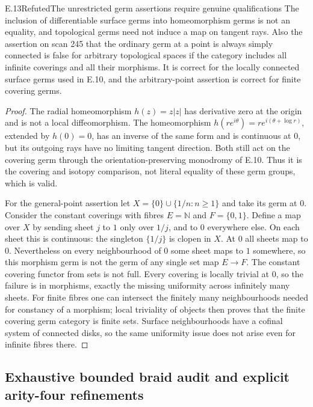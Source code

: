 \begin{statement}{E.13}{Refuted}{The unrestricted germ assertions require genuine qualifications}
The inclusion of differentiable surface germs into homeomorphism
germs is not an equality, and topological germs need not induce a
map on tangent rays.  Also the assertion on scan 245 that the
ordinary germ at a point is always simply connected is false for
arbitrary topological spaces if the category includes all infinite
coverings and all their morphisms.  It is correct for the locally
connected surface germs used in E.10, and the arbitrary-point
assertion is correct for finite covering germs.
\end{statement}
\begin{proof}
The radial homeomorphism $h(z)=z|z|$ has derivative zero at the
origin and is not a local diffeomorphism.  The homeomorphism
$h(re^{i\theta})=re^{i(\theta+\log r)}$, extended by $h(0)=0$,
has an inverse of the same form and is continuous at $0$, but
its outgoing rays have no limiting tangent direction.  Both still
act on the covering germ through the orientation-preserving
monodromy of E.10.  Thus it is the covering and isotopy comparison,
not literal equality of these germ groups, which is valid.

For the general-point assertion let
$X=\{0\}\cup\{1/n:n\geq1\}$ and take its germ at $0$.
Consider the constant coverings with fibres $E=\mathbb N$ and
$F=\{0,1\}$.  Define a map over $X$ by sending sheet $j$ to $1$
only over $1/j$, and to $0$ everywhere else.  On each sheet this
is continuous: the singleton $\{1/j\}$ is clopen in $X$.
At $0$ all sheets map to $0$.  Nevertheless on every neighbourhood
of $0$ some sheet maps to $1$ somewhere, so this morphism germ
is not the germ of any single set map $E\to F$.  The constant
covering functor from sets is not full.  Every covering is locally
trivial at $0$, so the failure is in morphisms, exactly the missing
uniformity across infinitely many sheets.  For finite fibres
one can intersect the finitely many neighbourhoods needed for
constancy of a morphism; local triviality of objects then proves
that the finite covering germ category is finite sets.  Surface
neighbourhoods have a cofinal system of connected disks, so the
same uniformity issue does not arise even for infinite fibres there.
\end{proof}

\subsection{Exhaustive bounded braid audit and explicit arity-four refinements}

